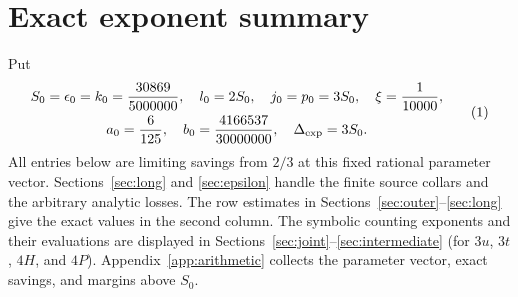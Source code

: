 \section{Exact exponent summary}\label{sec:ledger}

Put
\[
\begin{gathered}
S_0=\epsilon_0=k_0=\frac{30869}{5000000},\quad
l_0=2S_0,\quad j_0=p_0=3S_0,\quad \xi=\frac1{10000},\\
a_0=\frac6{125},\quad
b_0=\frac{4166537}{30000000},\quad
\Delta_{\rm exp}=3S_0.
\end{gathered}\AutoTag{eq:old:8_1}
\]
All entries below are limiting savings from \(2/3\) at this fixed
rational parameter vector. Sections~\ref{sec:long} and
\ref{sec:epsilon} handle the finite source collars and the arbitrary
analytic losses. The row estimates in Sections~\ref{sec:outer}--\ref{sec:long}
give the exact values in the second column. The symbolic counting exponents
and their evaluations are displayed in Sections~\ref{sec:joint}--\ref{sec:intermediate}
(for \(3u\), \(3t\), \(4H\), and \(4P\)). Appendix~\ref{app:arithmetic}
collects the parameter vector, exact savings, and margins above \(S_0\).

